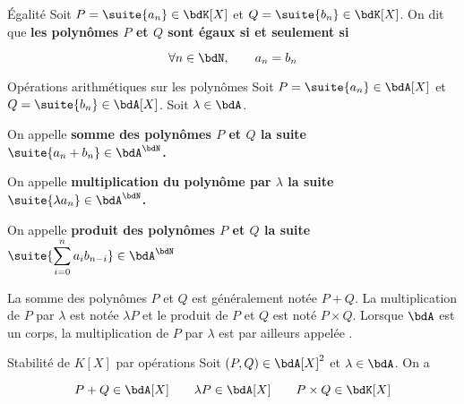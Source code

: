 \documentclass[a4paper,french,bookmarks]{article}
\begin{document}

\begin{definition}{Égalité}{}
    Soit $P = \suite{a_n} \in \bdK[X]$ et $Q = \suite{b_n} \in \bdK[X]$. On dit que \bf{les polynômes $P$ et $Q$ sont égaux} si et seulement si
    
    \[ \forall n \in \bdN,\qquad a_n = b_n\]
\end{definition}

\begin{definition}{Opérations arithmétiques sur les polynômes}
    Soit $P = \suite{a_n} \in \bdA[X]$ et $Q = \suite{b_n} \in \bdA[X]$. Soit $\lambda \in \bdA$.
    
    \begin{enumerate}
        \ithand On appelle \bf{somme des polynômes $P$ et $Q$} la suite $\suite{a_n + b_n} \in \bdA^\bdN$.
        
        \ithand On appelle \bf{multiplication du polynôme par $\lambda$} la suite $\suite{\lambda a_n} \in \bdA^\bdN$.
        
        \ithand On appelle \bf{produit des polynômes $P$ et $Q$} la suite $\suite{\displaystyle \sum_{i=0}^n a_ib_{n-i}} \in \bdA^\bdN$
        
    \end{enumerate}
\end{definition}

La somme des polynômes $P$ et $Q$ est généralement notée $P + Q$. La multiplication de $P$ par $\lambda$ est notée $\lambda P$ et le produit de $P$ et $Q$ est noté $P\times Q$. Lorsque $\bdA$ est un corps, la multiplication de $P$ par $\lambda$ est par ailleurs appelée .

\begin{property}{Stabilité de $K[X]$ par opérations}{}
    Soit $(P, Q) \in \bdA[X]^2$ et $\lambda \in \bdA$. On a 
    
    \[ P + Q \in \bdA[X] \qquad \lambda P \in \bdA[X] \qquad P\times Q \in \bdK[X]\]
\end{property}
\end{document}
